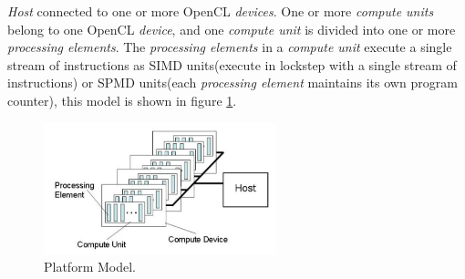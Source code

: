 \par{\emph{Host} connected to one or more OpenCL \emph{devices}. One or more 
    \emph{compute units} belong to one OpenCL \emph{device}, and one \emph{compute unit} is divided into one or more
    \emph{processing elements}. The \emph{processing elements} in a \emph{compute unit} execute a single stream of instructions
    as SIMD units(execute in lockstep with a single stream of instructions) or SPMD units(each \emph{processing element} 
    maintains its own program counter), this model is shown in figure \ref{PlatformModel}\cite{opencl12}.}

\begin{figure}
    \centering
    \includegraphics[width=0.6\textwidth]{figures/PlatformModel.png}
    \caption{Platform Model\cite{opencl12}.}
    \label{PlatformModel}
\end{figure}

